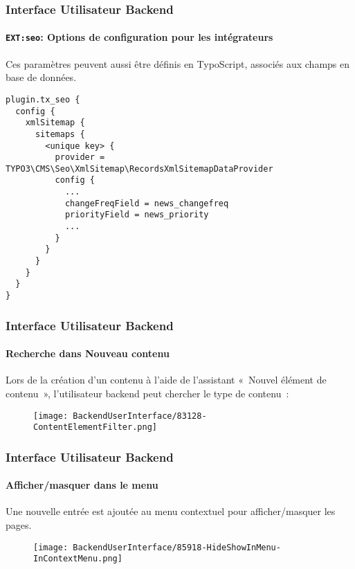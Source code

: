 
\begin{frame}[fragile]
	\frametitle{Interface Utilisateur Backend}
	\framesubtitle{\texttt{EXT:seo}: Options de configuration pour les intégrateurs}

	\lstset{basicstyle=\tiny\ttfamily}

	Ces paramètres peuvent aussi être définis en TypoScript, associés aux champs en base de données.

	\begin{lstlisting}
plugin.tx_seo {
  config {
    xmlSitemap {
      sitemaps {
        <unique key> {
          provider = TYPO3\CMS\Seo\XmlSitemap\RecordsXmlSitemapDataProvider
          config {
            ...
            changeFreqField = news_changefreq
            priorityField = news_priority
            ...
          }
        }
      }
    }
  }
}
	\end{lstlisting}

\end{frame}


\begin{frame}[fragile]
	\frametitle{Interface Utilisateur Backend}
	\framesubtitle{Recherche dans Nouveau contenu}

	Lors de la création d'un contenu à l'aide de l'assistant «~Nouvel élément de contenu~»,
	l'utilisateur backend peut chercher le type de contenu~:

	\begin{figure}
		\texttt{[image: BackendUserInterface/83128-ContentElementFilter.png]}
	\end{figure}

\end{frame}


\begin{frame}[fragile]
	\frametitle{Interface Utilisateur Backend}
	\framesubtitle{Afficher/masquer dans le menu}

	Une nouvelle entrée est ajoutée au menu contextuel pour afficher/masquer les pages.

	\begin{figure}
		\texttt{[image: BackendUserInterface/85918-HideShowInMenu-InContextMenu.png]}
	\end{figure}

\end{frame}

